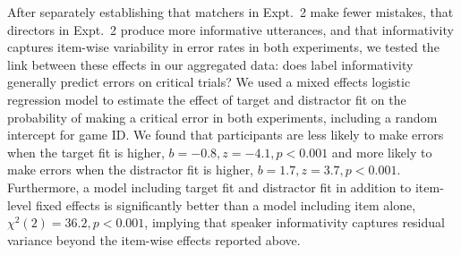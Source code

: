 \documentclass[manuscript]{stjour}
\begin{document}
After separately establishing that matchers in Expt.~2 make fewer mistakes, that directors in Expt.~2 produce more informative utterances, and that informativity captures item-wise variability in error rates in both experiments, we tested the link between these effects in our aggregated data: does label informativity generally predict errors on critical trials? We used a mixed effects logistic regression model to estimate the effect of target and distractor fit on the probability of making a critical error in both experiments, including a random intercept for game ID. We found that participants are less likely to make errors when the target fit is higher, $b = -0.8, z = -4.1, p < 0.001$ and more likely to make errors when the distractor fit is higher, $b = 1.7, z = 3.7, p < 0.001$. Furthermore, a model including target fit and distractor fit in addition to item-level fixed effects is significantly better than a model including item alone, $\chi^2(2) = 36.2, p < 0.001$, implying that speaker informativity captures residual variance beyond the item-wise effects reported above.





\end{document}
